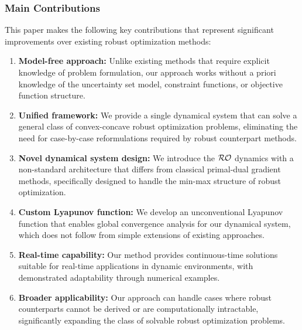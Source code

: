\documentclass[journal,twoside,web]{ieeecolor}
\begin{document}
{\color{blue} \subsubsection{Main Contributions}
This paper makes the following key contributions that represent significant improvements over existing robust optimization methods:

\begin{enumerate}
\item \textbf{Model-free approach:} Unlike existing methods that require explicit knowledge of problem formulation, our approach works without a priori knowledge of the uncertainty set model, constraint functions, or objective function structure.
\item \textbf{Unified framework:} We provide a single dynamical system that can solve a general class of convex-concave robust optimization problems, eliminating the need for case-by-case reformulations required by robust counterpart methods.
\item \textbf{Novel dynamical system design:} We introduce the ${\cal RO}$ dynamics with a non-standard architecture that differs from classical primal-dual gradient methods, specifically designed to handle the min-max structure of robust optimization.
\item \textbf{Custom Lyapunov function:} We develop an unconventional Lyapunov function that enables global convergence analysis for our dynamical system, which does not follow from simple extensions of existing approaches.
\item \textbf{Real-time capability:} Our method provides continuous-time solutions suitable for real-time applications in dynamic environments, with demonstrated adaptability through numerical examples.
\item \textbf{Broader applicability:} Our approach can handle cases where robust counterparts cannot be derived or are computationally intractable, significantly expanding the class of solvable robust optimization problems.
\end{enumerate}}
\end{document}
